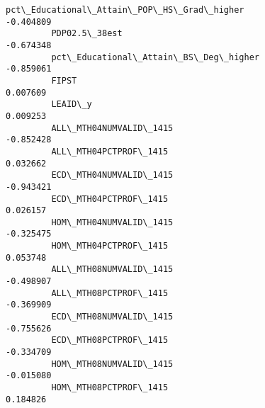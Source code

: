 \documentclass[11pt]{article}
\begin{document}
\begin{Verbatim}[commandchars=\\\{\}]
         pct\_Educational\_Attain\_POP\_HS\_Grad\_higher                     -0.404809   
         PDP02.5\_38est                                                 -0.674348   
         pct\_Educational\_Attain\_BS\_Deg\_higher                          -0.859061   
         FIPST                                                          0.007609   
         LEAID\_y                                                        0.009253   
         ALL\_MTH04NUMVALID\_1415                                        -0.852428   
         ALL\_MTH04PCTPROF\_1415                                          0.032662   
         ECD\_MTH04NUMVALID\_1415                                        -0.943421   
         ECD\_MTH04PCTPROF\_1415                                          0.026157   
         HOM\_MTH04NUMVALID\_1415                                        -0.325475   
         HOM\_MTH04PCTPROF\_1415                                          0.053748   
         ALL\_MTH08NUMVALID\_1415                                        -0.498907   
         ALL\_MTH08PCTPROF\_1415                                         -0.369909   
         ECD\_MTH08NUMVALID\_1415                                        -0.755626   
         ECD\_MTH08PCTPROF\_1415                                         -0.334709   
         HOM\_MTH08NUMVALID\_1415                                        -0.015080   
         HOM\_MTH08PCTPROF\_1415                                          0.184826   
         

\end{Verbatim}
\end{document}
